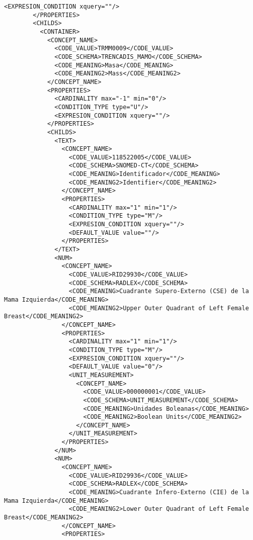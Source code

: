 \begin{lstlisting}[label=some-code,caption=Some Code]
          <EXPRESION_CONDITION xquery=""/>
        </PROPERTIES>
        <CHILDS>
          <CONTAINER>
            <CONCEPT_NAME>
              <CODE_VALUE>TRMM0009</CODE_VALUE>
              <CODE_SCHEMA>TRENCADIS_MAMO</CODE_SCHEMA>
              <CODE_MEANING>Masa</CODE_MEANING>
              <CODE_MEANING2>Mass</CODE_MEANING2>
            </CONCEPT_NAME>
            <PROPERTIES>
              <CARDINALITY max="-1" min="0"/>
              <CONDITION_TYPE type="U"/>
              <EXPRESION_CONDITION xquery=""/>
            </PROPERTIES>
            <CHILDS>
              <TEXT>
                <CONCEPT_NAME>
                  <CODE_VALUE>118522005</CODE_VALUE>
                  <CODE_SCHEMA>SNOMED-CT</CODE_SCHEMA>
                  <CODE_MEANING>Identificador</CODE_MEANING>
                  <CODE_MEANING2>Identifier</CODE_MEANING2>
                </CONCEPT_NAME>
                <PROPERTIES>
                  <CARDINALITY max="1" min="1"/>
                  <CONDITION_TYPE type="M"/>
                  <EXPRESION_CONDITION xquery=""/>
                  <DEFAULT_VALUE value=""/>
                </PROPERTIES>
              </TEXT>
              <NUM>
                <CONCEPT_NAME>
                  <CODE_VALUE>RID29930</CODE_VALUE>
                  <CODE_SCHEMA>RADLEX</CODE_SCHEMA>
                  <CODE_MEANING>Cuadrante Supero-Externo (CSE) de la Mama Izquierda</CODE_MEANING>
                  <CODE_MEANING2>Upper Outer Quadrant of Left Female Breast</CODE_MEANING2>
                </CONCEPT_NAME>
                <PROPERTIES>
                  <CARDINALITY max="1" min="1"/>
                  <CONDITION_TYPE type="M"/>
                  <EXPRESION_CONDITION xquery=""/>
                  <DEFAULT_VALUE value="0"/>
                  <UNIT_MEASUREMENT>
                    <CONCEPT_NAME>
                      <CODE_VALUE>000000001</CODE_VALUE>
                      <CODE_SCHEMA>UNIT_MEASUREMENT</CODE_SCHEMA>
                      <CODE_MEANING>Unidades Boleanas</CODE_MEANING>
                      <CODE_MEANING2>Boolean Units</CODE_MEANING2>
                    </CONCEPT_NAME>
                  </UNIT_MEASUREMENT>
                </PROPERTIES>
              </NUM>
              <NUM>
                <CONCEPT_NAME>
                  <CODE_VALUE>RID29936</CODE_VALUE>
                  <CODE_SCHEMA>RADLEX</CODE_SCHEMA>
                  <CODE_MEANING>Cuadrante Infero-Externo (CIE) de la Mama Izquierda</CODE_MEANING>
                  <CODE_MEANING2>Lower Outer Quadrant of Left Female Breast</CODE_MEANING2>
                </CONCEPT_NAME>
                <PROPERTIES>

\end{lstlisting}
